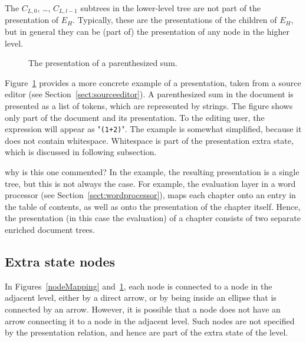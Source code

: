The $C_{L,0}$, \dots, $C_{L,l-1}$ subtrees in the lower-level tree are not part of the presentation of $E_H$. Typically, these are the presentations of the children of $E_H$, but in general they can be (part of) the presentation of any node in the higher level. 

\begin{figure}
\begin{center}
\begin{center}
%
%
\end{center}
\caption{The presentation of a parenthesized sum.}\label{presentExample} 
\end{center}
\end{figure}

Figure~\ref{presentExample} provides a more concrete example of a presentation, taken from a source editor (see Section~\ref{sect:sourceeditor}). A parenthesized sum in the document is presented as a list of tokens, which are represented by strings.  The figure shows only part of the document and its presentation. To the editing user, the expression will appear as "{\tt (1+2)}". The example is somewhat simplified, because it does not contain whitespace. Whitespace is part of the presentation extra state, which is discussed in following subsection.

\bc  why is this one commented?
In the example, the resulting presentation is a single tree, but this is not always the case. For example, the evaluation layer in a word processor (see Section~\ref{sect:wordprocessor}), maps each chapter onto an entry in the table of contents, as well as onto the presentation of the chapter itself. Hence, the presentation (in this case the evaluation) of a chapter consists of two separate enriched document trees.
\ec






%																
\subsection{Extra state nodes}

In Figures~\ref{nodeMapping} and~\ref{presentExample}, each node is connected to a node in the adjacent level, either by a direct arrow, or by being inside an ellipse that is connected by an arrow. However, it is possible that a node does not have an arrow connecting it to a node in the adjacent level. Such nodes are not specified by the presentation relation, and hence are part of the extra state of the level.

